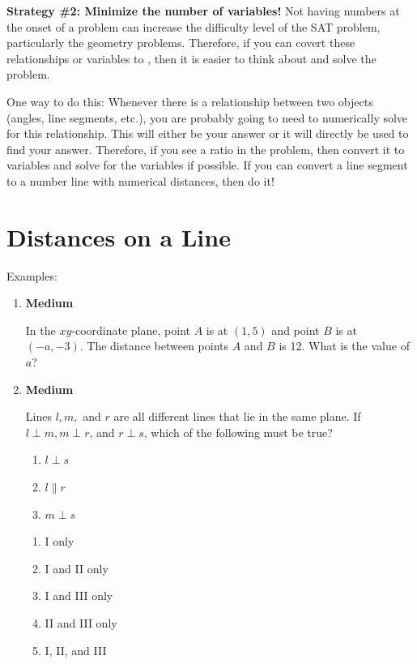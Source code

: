 \documentclass[12pt]{book}
\begin{document}
\bigskip
\textbf{Strategy \#2: Minimize the number of variables!} Not having numbers at the onset of a problem can increase the difficulty level of the SAT problem, particularly the geometry problems. Therefore, if you can covert these relationships or variables to \underline{\hspace{1.5in}}, then it is easier to think about and solve the problem.

\bigskip
One way to do this: Whenever there is a relationship between two objects (angles, line segments, etc.), you are probably going to need to numerically solve for this relationship. This will either be your answer or it will directly be used to find your answer. Therefore, if you see a ratio in the problem, then convert it to variables and solve for the variables if possible. If you can convert a line segment to a number line with numerical distances, then do it!

\vfill
\newpage
\section{Distances on a Line}

\bigskip
Examples:

\begin{multicols}{2}
\begin{enumerate}[label*=\arabic*.]
\item \textbf{Medium}

In the $xy$-coordinate plane, point $A$ is at $(1,5)$ and point $B$ is at $(-a,-3)$. The distance between points $A$ and $B$ is 12. What is the value of $a$?
\vfill
\phantom{}
\columnbreak
\item \textbf{Medium}

Lines $l, m,$ and $r$ are all different lines that lie in the same plane. If $l\perp m, m\perp r$, and $r\perp s$, which of the following must be true?

\bigskip
\begin{enumerate}[label=\Roman*.]
\item $l\perp s$
\item $l\parallel r$
\item $m\perp s$
\end{enumerate}

\begin{enumerate}[label=(\Alph*)]
\item I only
\item I and II only
\item I and III only
\item II and III only
\item I, II, and III
\end{enumerate}
\end{enumerate}
\end{multicols}
\end{document}
